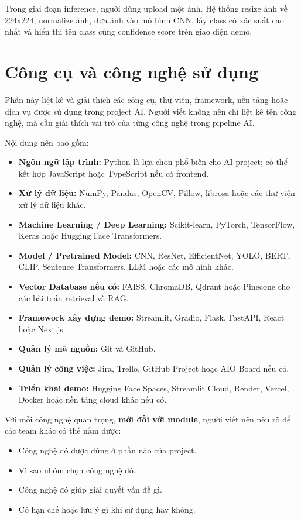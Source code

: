 \documentclass[12pt]{ai_conquer2026}
\begin{document}
\begin{aivncodebox}[Ví dụ:]
Trong giai đoạn inference, người dùng upload một ảnh. Hệ thống resize ảnh về 224x224, normalize ảnh, đưa ảnh vào mô hình CNN, lấy class có xác suất cao nhất và hiển thị tên class cùng confidence score trên giao diện demo.
\end{aivncodebox}

\section{Công cụ và công nghệ sử dụng}

Phần này liệt kê và giải thích các công cụ, thư viện, framework, nền tảng hoặc dịch vụ được sử dụng trong project AI. Người viết không nên chỉ liệt kê tên công nghệ, mà cần giải thích vai trò của từng công nghệ trong pipeline AI.

Nội dung nên bao gồm:

\begin{itemize}
\item \textbf{Ngôn ngữ lập trình:} Python là lựa chọn phổ biến cho AI project; có thể kết hợp JavaScript hoặc TypeScript nếu có frontend.
\item \textbf{Xử lý dữ liệu:} NumPy, Pandas, OpenCV, Pillow, librosa hoặc các thư viện xử lý dữ liệu khác.
\item \textbf{Machine Learning / Deep Learning:} Scikit-learn, PyTorch, TensorFlow, Keras hoặc Hugging Face Transformers.
\item \textbf{Model / Pretrained Model:} CNN, ResNet, EfficientNet, YOLO, BERT, CLIP, Sentence Transformers, LLM hoặc các mô hình khác.
\item \textbf{Vector Database nếu có:} FAISS, ChromaDB, Qdrant hoặc Pinecone cho các bài toán retrieval và RAG.
\item \textbf{Framework xây dựng demo:} Streamlit, Gradio, Flask, FastAPI, React hoặc Next.js.
\item \textbf{Quản lý mã nguồn:} Git và GitHub.
\item \textbf{Quản lý công việc:} Jira, Trello, GitHub Project hoặc AIO Board nếu có.
\item \textbf{Triển khai demo:} Hugging Face Spaces, Streamlit Cloud, Render, Vercel, Docker hoặc nền tảng cloud khác nếu có.
\end{itemize}

Với mỗi công nghệ quan trọng, \textbf{mới đối với module}, người viết nên nêu rõ để các team khác có thể nắm được:
\begin{itemize}
\item Công nghệ đó được dùng ở phần nào của project.
\item Vì sao nhóm chọn công nghệ đó.
\item Công nghệ đó giúp giải quyết vấn đề gì.
\item Có hạn chế hoặc lưu ý gì khi sử dụng hay không.
\end{itemize}
\end{document}
